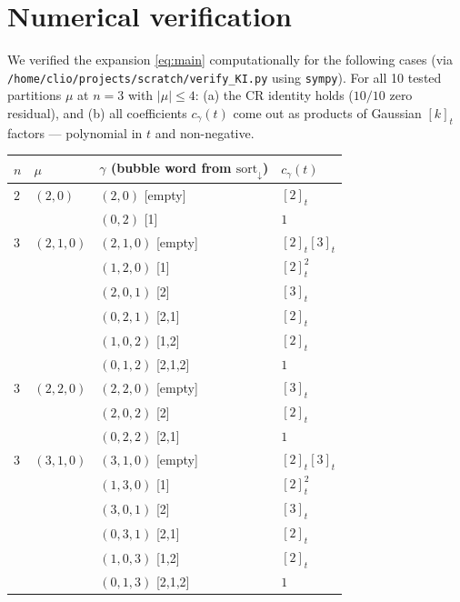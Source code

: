\documentclass[11pt]{article}
\theoremstyle{definition}
\begin{document}
\section{Numerical verification}\label{sec:numerical}

We verified the expansion \eqref{eq:main} computationally for the
following cases (via
\texttt{/home/clio/projects/scratch/verify\_KI.py} using \texttt{sympy}).
For all 10 tested partitions $\mu$ at $n = 3$ with $|\mu| \le 4$: (a) the
CR identity holds ($10/10$ zero residual), and (b) all coefficients
$c_\gamma(t)$ come out as products of Gaussian $[k]_t$ factors ---
polynomial in $t$ and non-negative.

\begin{center}
\begin{tabular}{|l|l|l|l|}
\hline
$n$ & $\mu$ & $\gamma$ (bubble word from $\mathrm{sort}_\downarrow$) & $c_\gamma(t)$ \\
\hline
$2$ & $(2,0)$ & $(2,0)$ [empty] & $[2]_t$ \\
    &         & $(0,2)$ [1]     & $1$ \\
\hline
$3$ & $(2,1,0)$ & $(2,1,0)$ [empty] & $[2]_t[3]_t$ \\
    &           & $(1,2,0)$ [1]     & $[2]_t^2$ \\
    &           & $(2,0,1)$ [2]     & $[3]_t$ \\
    &           & $(0,2,1)$ [2,1]   & $[2]_t$ \\
    &           & $(1,0,2)$ [1,2]   & $[2]_t$ \\
    &           & $(0,1,2)$ [2,1,2] & $1$ \\
\hline
$3$ & $(2,2,0)$ & $(2,2,0)$ [empty] & $[3]_t$ \\
    &           & $(2,0,2)$ [2]     & $[2]_t$ \\
    &           & $(0,2,2)$ [2,1]   & $1$ \\
\hline
$3$ & $(3,1,0)$ & $(3,1,0)$ [empty] & $[2]_t[3]_t$ \\
    &           & $(1,3,0)$ [1]     & $[2]_t^2$ \\
    &           & $(3,0,1)$ [2]     & $[3]_t$ \\
    &           & $(0,3,1)$ [2,1]   & $[2]_t$ \\
    &           & $(1,0,3)$ [1,2]   & $[2]_t$ \\
    &           & $(0,1,3)$ [2,1,2] & $1$ \\
\hline
\end{tabular}
\end{center}
\end{document}
